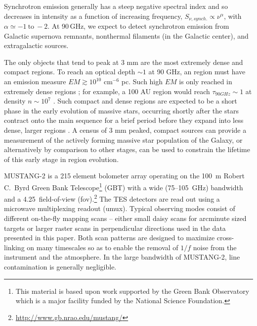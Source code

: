 \documentclass[twocolumn]{aastex62}
\newcommand{\MUSTANG}{MUSTANG-2\xspace}
\begin{document}
Synchrotron emission generally has a steep negative spectral index and so
decreases in intensity as a function of increasing frequency, $S_{\nu,
synch.}\propto \nu^{\alpha}$, with $\alpha\simeq -1 \mathrm{~to~} -2$.  At 90\,GHz, we expect
to detect synchrotron emission from Galactic supernova remnants, nonthermal
filaments (in the Galactic center), and extragalactic sources.

The only objects that tend to peak at 3 mm are the most extremely dense and
compact \hii regions.  To reach an optical depth $\sim1$ at 90 GHz, an \hii
region must have an emission measure $EM\gtrsim10^{10}$ cm$^{-6}$ pc.  Such high $EM$ is
only reached in extremely dense regions \citep[e.g.][]{Galvan-Madrid2009a}; for example, a 100 AU \hii region
would reach $\tau_{90 GHz}\sim1$ at density $n\sim10^7$ \percc
\citep[][]{Wilson2009a,Condon2016a}.  Such compact and dense \hii regions are
expected to be a short phase in the early evolution of massive stars, occurring
shortly after the stars contract onto the main sequence for a brief period
before they expand into less dense, larger \hii regions \citep{Wood1989b}.  A
census of 3 mm peaked, compact sources can provide a measurement of the
actively forming massive star population of the Galaxy, or alternatively by
comparison to other stages, can be used to constrain the lifetime of this early
stage in \hii region evolution.


\MUSTANG \citep{Dicker2014a} is a 215 element bolometer array operating on the
100~m Robert C.\ Byrd Green Bank Telescope\footnote{This material is
based upon work supported by the Green Bank Observatory which is a major
facility funded by the National Science Foundation.} (GBT) with a wide
(75--105~GHz) bandwidth and a 4.25\arcmin\ field-of-view
(fov).\footnote{\url{http://www.gb.nrao.edu/mustang/}}  The TES detectors are 
read out using a microwave multiplexing readout (umux). Typical
observing modes consist of different on-the-fly mapping scans -- either small
daisy scans for arcminute sized targets or larger raster scans in perpendicular
directions used in the data presented in this paper.  Both scan patterns are
designed to maximize cross-linking on many timescales so as to enable the
removal of $1/f$ noise from the instrument and the atmosphere.  In the large
bandwidth of \MUSTANG, line contamination is generally negligible.
\end{document}
